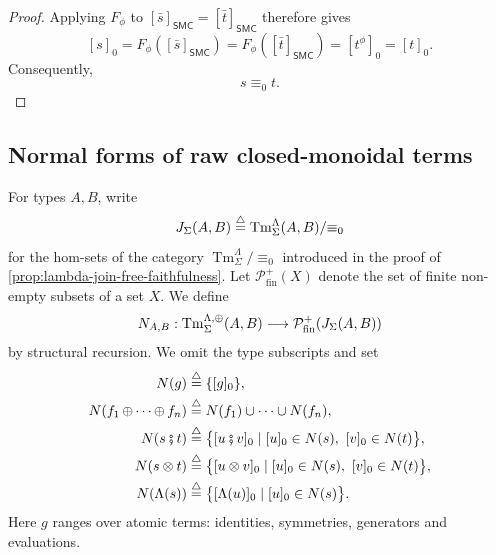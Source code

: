 \begin{proof}
Applying \(F_\phi\) to
\(
[\bar s]_{\mathsf{SMC}}=[\bar t]_{\mathsf{SMC}}
\)
therefore gives
\[
  [s]_0
  =
  F_\phi([\bar s]_{\mathsf{SMC}})
  =
  F_\phi([\bar t]_{\mathsf{SMC}})
  =
  [t^\phi]_0
  =
  [t]_0.
\]
Consequently,
\[
  s\equiv_0t.
\]
\end{proof}



\subsection{Normal forms of raw closed-monoidal terms}

For types $A,B$, write
\[
 J_{\Sigma}(A,B)
 \stackrel{\triangle}{=}
 \operatorname{Tm}^{\Lambda}_{\Sigma}(A,B)/{\equiv_{0}}
\]
for the hom-sets of the category
$\operatorname{Tm}^{\Lambda}_{\Sigma}/{\equiv_0}$ introduced in the proof of
\cref{prop:lambda-join-free-faithfulness}.
Let $\mathcal P^{+}_{\mathrm{fin}}(X)$ denote the set of finite non-empty
subsets of a set $X$.  We define
\[
 N_{A,B}:
 \operatorname{Tm}^{\Lambda,\operatorname{\oplus}}_{\Sigma}(A,B)
 \longrightarrow
 \mathcal P^{+}_{\mathrm{fin}}(J_{\Sigma}(A,B))
\]
by structural recursion.  We omit the type subscripts and set
\begin{align*}
 N(g)
   &\stackrel{\triangle}{=} \{[g]_{0}\},\\
 N(f_1\operatorname{\oplus}\cdots\operatorname{\oplus} f_n)
   &\stackrel{\triangle}{=} N(f_1)\cup\cdots\cup N(f_n),\\
 N(s\fatsemi t)
   &\stackrel{\triangle}{=}
     \bigl\{[u\fatsemi v]_{0}
       \mathrel{|}[u]_{0}\in N(s),\ [v]_{0}\in N(t)\bigr\},\\
 N(s\otimes t)
   &\stackrel{\triangle}{=}
     \bigl\{[u\otimes v]_{0}
       \mathrel{|}[u]_{0}\in N(s),\ [v]_{0}\in N(t)\bigr\},\\
 N(\Lambda(s))
   &\stackrel{\triangle}{=}
     \bigl\{[\Lambda(u)]_{0}
       \mathrel{|}[u]_{0}\in N(s)\bigr\}.
\end{align*}
Here $g$ ranges over atomic terms: identities, symmetries, generators
and evaluations.  

